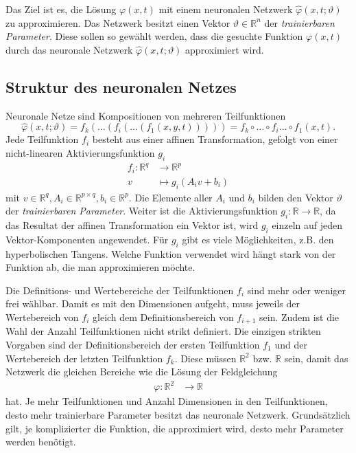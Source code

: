 Das Ziel ist es, die Lösung $\varphi(x, t)$ mit einem neuronalen Netzwerk $\hat{\varphi}(x, t; \vartheta)$ zu approximieren.
Das Netzwerk besitzt einen Vektor \( \vartheta \in \mathbb{R}^n \) der \emph{trainierbaren Parameter}.
Diese sollen so gewählt werden, dass die gesuchte Funktion $\varphi(x, t)$ durch das neuronale Netzwerk $\hat{\varphi}(x, t; \vartheta)$ approximiert wird.


\subsection{Struktur des neuronalen Netzes}\label{neuronal:subsection:struktur_nn}
Neuronale Netze sind Kompositionen von mehreren Teilfunktionen
\begin{equation}
    \hat{\varphi}(x, t; \vartheta) = f_k(\ldots(f_i(\ldots(f_1(x, y, t))))) = f_k \circ \ldots \circ f_i \ldots \circ f_1(x, t).
    \label{neuronal:nn_ausformuliert}
\end{equation}
Jede Teilfunktion \( f_i \) besteht aus einer affinen Transformation, gefolgt von einer nicht-linearen Aktivierungsfunktion \( g_i \)
\begin{align*}
    f_i\colon \mathbb{R}^q & \longrightarrow\mathbb{R}^p \\[-1ex]
    v & \longmapsto g_i(A_iv + b_i)
\end{align*}
mit \( v \in \mathbb{R}^q, A_i \in \mathbb{R}^{p \times q}, b_i \in \mathbb{R}^p \). 
Die Elemente aller \( A_i \) und \( b_i \) bilden den Vektor \( \vartheta \) der \emph{trainierbaren Parameter}.
Weiter ist die Aktivierungsfunktion \( g_i\colon \mathbb{R} \longrightarrow\mathbb{R} \), da das Resultat der affinen Transformation ein Vektor ist, wird \( g_i \) einzeln auf jeden Vektor-Komponenten angewendet.
Für \( g_i \) gibt es viele Möglichkeiten, z.B. den hyperbolischen Tangens.
Welche Funktion verwendet wird hängt stark von der Funktion ab, die man approximieren möchte.

Die Definitions- und Wertebereiche der Teilfunktionen \( f_i \) sind mehr oder weniger frei wählbar.
Damit es mit den Dimensionen aufgeht, muss jeweils der Wertebereich von \( f_i \) gleich dem Definitionsbereich von \( f_{i+1} \) sein.
Zudem ist die Wahl der Anzahl Teilfunktionen nicht strikt definiert.
Die einzigen strikten Vorgaben sind der Definitionsbereich der ersten Teilfunktion \( f_1 \) und der Wertebereich der letzten Teilfunktion \( f_k \).
Diese müssen \( \mathbb{R}^2 \) bzw. \( \mathbb{R} \) sein, damit das Netzwerk die gleichen Bereiche wie die Lösung der Feldgleichung
\begin{align*}
    \varphi\colon \mathbb{R}^2 & \longrightarrow\mathbb{R}
\end{align*}
hat.
Je mehr Teilfunktionen und Anzahl Dimensionen in den Teilfunktionen, desto mehr trainierbare Parameter besitzt das neuronale Netzwerk.
Grundsätzlich gilt, je komplizierter die Funktion, die approximiert wird, desto mehr Parameter werden benötigt.

